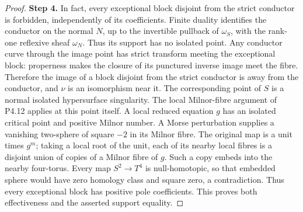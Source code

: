 \begin{proof}
\noindent\textbf{Step 4.} In fact, every exceptional block disjoint from
the strict conductor is forbidden, independently
of its coefficients. Finite duality identifies
the conductor on the normal $N$, up to the
invertible pullback of $\omega_S$, with the
rank-one reflexive sheaf $\omega_N$. Thus its
support has no isolated point. Any conductor
curve through the image point has strict
transform meeting the exceptional block:
properness makes the closure of its punctured
inverse image meet the fibre. Therefore the
image of a block disjoint from the strict
conductor is away from the conductor, and
$\nu$ is an isomorphism near it. The
corresponding point of $S$ is a normal isolated
hypersurface singularity. The local
Milnor-fibre argument of P4.12 applies
at this point itself. A local reduced
equation $g$ has an isolated critical
point and positive Milnor number. A
Morse perturbation supplies a vanishing
two-sphere of square $-2$ in its Milnor
fibre. The original map is a unit times
$g^m$; taking a local root of the unit,
each of its nearby local fibres is a
disjoint union of copies of a Milnor
fibre of $g$. Such a copy embeds into
the nearby four-torus. Every map
$S^2\to T^4$ is null-homotopic, so that
embedded sphere would have zero
homology class and square zero, a
contradiction. Thus every exceptional
block has positive pole coefficients.
This proves both effectiveness and the
asserted support equality.
\end{proof}

